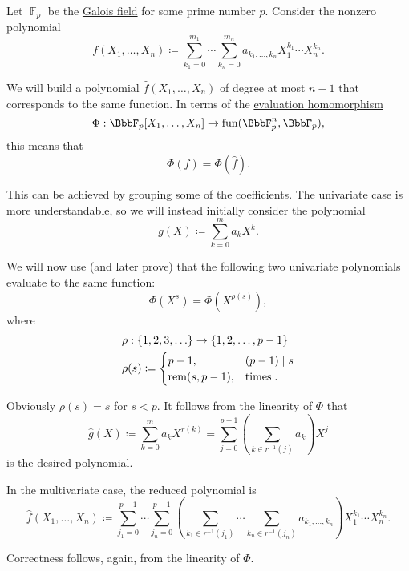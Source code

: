 \begin{algorithm}\label{alg:finite_field_polynomial_reduction}
  Let \( \BbbF_p \) be the \hyperref[thm:galois_field_existence]{Galois field} for some prime number \( p \). Consider the nonzero polynomial
  \begin{equation*}
    f(X_1, \ldots, X_n) \coloneqq \sum_{k_1=0}^{m_1} \cdots \sum_{k_n=0}^{m_n} a_{k_1,\ldots,k_n} X_1^{k_1} \cdots X_n^{k_n}.
  \end{equation*}

  We will build a polynomial \( \hat f(X_1, \ldots, X_n) \) of degree at most \( n - 1 \) that corresponds to the same function. In terms of the \hyperref[thm:polynomial_ring_universal_property]{evaluation homomorphism}
  \begin{equation*}
    \Phi: \BbbF_p[X_1, \ldots, X_n] \to \fun(\BbbF_p^n, \BbbF_p),
  \end{equation*}
  this means that
  \begin{equation*}
    \Phi(f) = \Phi(\hat f).
  \end{equation*}

  This can be achieved by grouping some of the coefficients. The univariate case is more understandable, so we will instead initially consider the polynomial
  \begin{equation*}
    g(X) \coloneqq \sum_{k=0}^m a_k X^k.
  \end{equation*}

  We will now use (and later prove) that the following two univariate polynomials evaluate to the same function:
  \begin{equation}\label{eq:alg:finite_field_polynomial_reduction/reduction}
    \Phi(X^s) = \Phi(X^{\rho(s)}),
  \end{equation}
  where
  \begin{align*}
    &\rho: \{ 1, 2, 3, \ldots \} \to \{ 1, 2, \ldots, p - 1 \} \\
    &\rho(s) \coloneqq \begin{cases}
      p - 1,          &(p - 1) \mid s \\
      \rem(s, p - 1), &\T{times}.
    \end{cases}
  \end{align*}

  Obviously \( \rho(s) = s \) for \( s < p \). It follows from the linearity of \( \Phi \) that
  \begin{equation*}
    \hat g(X)
    \coloneqq
    \sum_{k=0}^m a_k X^{r(k)}
    =
    \sum_{j=0}^{p-1} \left( \sum_{k \in r^{-1}(j)} a_k \right) X^j
  \end{equation*}
  is the desired polynomial.

  In the multivariate case, the reduced polynomial is
  \begin{equation*}
    \hat f(X_1, \ldots, X_n) \coloneqq \sum_{j_1=0}^{p-1} \cdots \sum_{j_n=0}^{p-1} \left( \sum_{k_1 \in r^{-1}(j_1)} \cdots \sum_{k_n \in r^{-1}(j_n)} a_{k_1,\ldots,k_n} \right) X_1^{k_1} \cdots X_n^{k_n}.
  \end{equation*}

  Correctness follows, again, from the linearity of \( \Phi \).
\end{algorithm}
